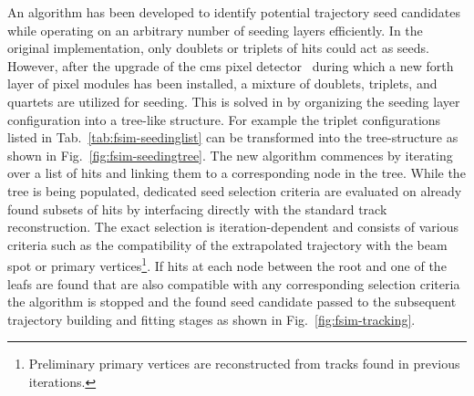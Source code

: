 An algorithm has been developed to identify potential trajectory seed candidates while operating on an arbitrary number of seeding layers efficiently. In the original implementation, only doublets or triplets of hits could act as seeds. However, after the upgrade of the \gls{cms} pixel detector~\cite{Dominguez:1481838} during which a new forth layer of pixel modules has been installed, a mixture of doublets, triplets, and quartets are utilized for seeding. This is solved in \FSIM by organizing the seeding layer configuration into a tree-like structure. For example the triplet configurations listed in Tab.~\ref{tab:fsim-seedinglist} can be transformed into the tree-structure as shown in Fig.~\ref{fig:fsim-seedingtree}. The new algorithm commences by iterating over a list of hits and linking them to a corresponding node in the tree. While the tree is being populated, dedicated seed selection criteria are evaluated on already found subsets of hits by interfacing directly with the standard track reconstruction. The exact selection is iteration-dependent and consists of various criteria such as the compatibility of the extrapolated trajectory with the beam spot or primary vertices\footnote{Preliminary primary vertices are reconstructed from tracks found in previous iterations.}. If hits at each node between the root and one of the leafs are found that are also compatible with any corresponding selection criteria the algorithm is stopped and the found seed candidate passed to the subsequent trajectory building and fitting stages as shown in Fig.~\ref{fig:fsim-tracking}.




